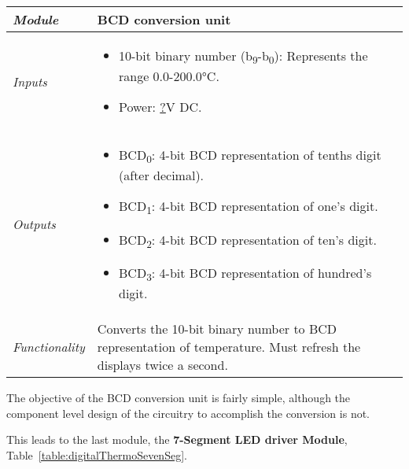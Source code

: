 \begin{table}[h]
\label{table:digitalThermoBcdConvUnit}
\begin{tabular}{|l|m{10cm}|}
\hline
\emph{Module} & BCD conversion unit\\ \hline
\emph{Inputs} & 
\begin{itemize}
\item
  10-bit binary number (b\textsubscript{9}-b\textsubscript{0}):
  Represents the range 0.0-200.0°C.
\item
  Power: \ul{?}V DC.
\end{itemize}  \\ \hline
\emph{Outputs} & 
\begin{itemize}
\item
  BCD\textsubscript{0}: 4-bit BCD representation of tenths digit (after
  decimal).
\item
  BCD\textsubscript{1}: 4-bit BCD representation of one's digit.
\item
  BCD\textsubscript{2}: 4-bit BCD representation of ten's digit.
\item
  BCD\textsubscript{3}: 4-bit BCD representation of hundred's digit.
\end{itemize}\\ \hline
\emph{Functionality} & Converts the 10-bit binary number to BCD
representation of temperature. Must refresh the displays twice a
second. \\ \hline
\end{tabular}
\end{table}



The objective of the BCD conversion unit is fairly simple, although the
component level design of the circuitry to accomplish the conversion is
not.

This leads to the last module, 
the \textbf{7-Segment LED driver Module}, 
Table~\ref{table:digitalThermoSevenSeg}.


